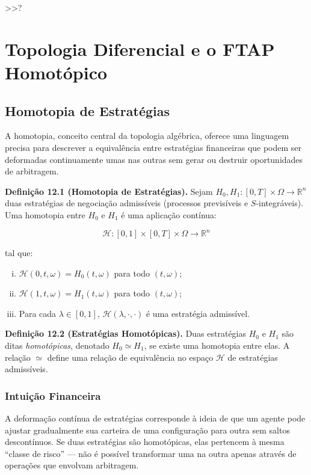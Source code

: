  >>?\chapter{Topologia Diferencial e o FTAP Homot\'opico}

\section{Homotopia de Estrat\'egias}

A homotopia, conceito central da topologia alg\'ebrica, oferece uma linguagem precisa para descrever a equival\^encia entre estrat\'egias financeiras que podem ser deformadas continuamente umas nas outras sem gerar ou destruir oportunidades de arbitragem.

\smallskip
\noindent\textbf{Defini\c{c}\~ao 12.1 (Homotopia de Estrat\'egias).} Sejam $H_0, H_1: [0,T] \times \Omega \to \mathbb{R}^n$ duas estrat\'egias de negocia\c{c}\~ao admiss\'iveis (processos previs\'iveis e $S$-integr\'aveis). Uma homotopia entre $H_0$ e $H_1$ \'e uma aplica\c{c}\~ao cont\'inua:

\begin{equation}\label{eq:homotopia-estrategias}
\mathscr{H}: [0,1] \times [0,T] \times \Omega \to \mathbb{R}^n
\end{equation}

tal que:
\begin{enumerate}[(i)]
 \item $\mathscr{H}(0,t,\omega) = H_0(t,\omega)$ para todo $(t,\omega)$;
 \item $\mathscr{H}(1,t,\omega) = H_1(t,\omega)$ para todo $(t,\omega)$;
 \item Para cada $\lambda \in [0,1]$, $\mathscr{H}(\lambda,\cdot,\cdot)$ \'e uma estrat\'egia admiss\'ivel.
\end{enumerate}

\medskip
\noindent\textbf{Defini\c{c}\~ao 12.2 (Estrat\'egias Homot\'opicas).} Duas estrat\'egias $H_0$ e $H_1$ s\~ao ditas \textit{homot\'opicas}, denotado $H_0 \simeq H_1$, se existe uma homotopia entre elas. A rela\c{c}\~ao $\simeq$ define uma rela\c{c}\~ao de equival\^encia no espa\c{c}o $\mathcal{H}$ de estrat\'egias admiss\'iveis.

\subsection{Intui\c{c}\~ao Financeira}

A deforma\c{c}\~ao cont\'inua de estrat\'egias corresponde \`a ideia de que um agente pode ajustar gradualmente sua carteira de uma configura\c{c}\~ao para outra sem saltos descont\'inuos. Se duas estrat\'egias s\~ao homot\'opicas, elas pertencem \`a mesma ``classe de risco'' --- n\~ao \'e poss\'ivel transformar uma na outra apenas atrav\'es de opera\c{c}\~oes que envolvam arbitragem.

